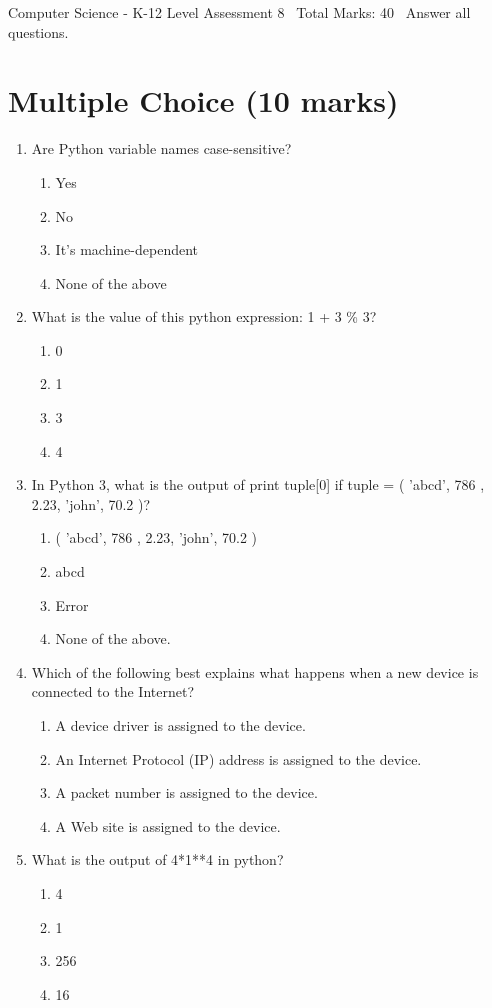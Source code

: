 \documentclass[12pt]{article}
\begin{document}
\begin{center}
Computer Science - K-12 Level Assessment 8 \
Total Marks: 40 \
Answer all questions.
\end{center}

\section*{Multiple Choice (10 marks)}
\begin{enumerate}[label=\arabic*.]
\item Are Python variable names case-sensitive?
\begin{enumerate}[label=(\alph*)]
    \item Yes
    \item No
    \item It's machine-dependent
    \item None of the above
\end{enumerate}
\item What is the value of this python expression: 1 + 3 \% 3?
\begin{enumerate}[label=(\alph*)]
    \item 0
    \item 1
    \item 3
    \item 4
\end{enumerate}
\item In Python 3, what is the output of print tuple[0] if tuple = ( 'abcd', 786 , 2.23, 'john', 70.2 )?
\begin{enumerate}[label=(\alph*)]
    \item ( 'abcd', 786 , 2.23, 'john', 70.2 )
    \item abcd
    \item Error
    \item None of the above.
\end{enumerate}
\item Which of the following best explains what happens when a new device is connected to the Internet?
\begin{enumerate}[label=(\alph*)]
    \item A device driver is assigned to the device.
    \item An Internet Protocol (IP) address is assigned to the device.
    \item A packet number is assigned to the device.
    \item A Web site is assigned to the device.
\end{enumerate}
\item What is the output of 4*1**4 in python?
\begin{enumerate}[label=(\alph*)]
    \item 4
    \item 1
    \item 256
    \item 16
\end{enumerate}
\end{enumerate}
\end{document}
